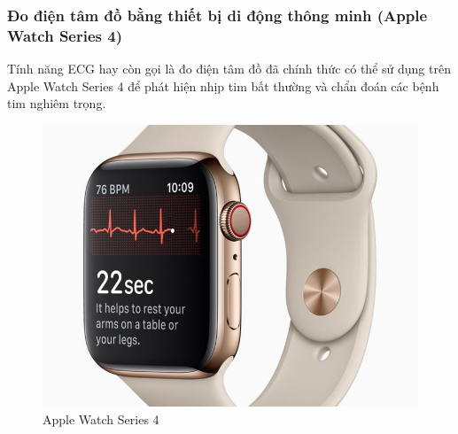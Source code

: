 \subsubsection{Đo điện tâm đồ bằng thiết bị di động thông minh (Apple Watch Series 4)}
Tính năng ECG hay còn gọi là đo điện tâm đồ đã chính thức có thể sử dụng trên Apple Watch Series 4 để phát hiện nhịp tim bất thường và chẩn đoán các bệnh tim nghiêm trọng.
\begin{center}
    \begin{figure}[htp]
    \begin{center}
    \includegraphics[scale=.3]{image/chapter1/apple-watch-series4-ecg-crown-09122018.jpg}
    \end{center}
    \caption{Apple Watch Series 4}
    \end{figure}
\end{center}

